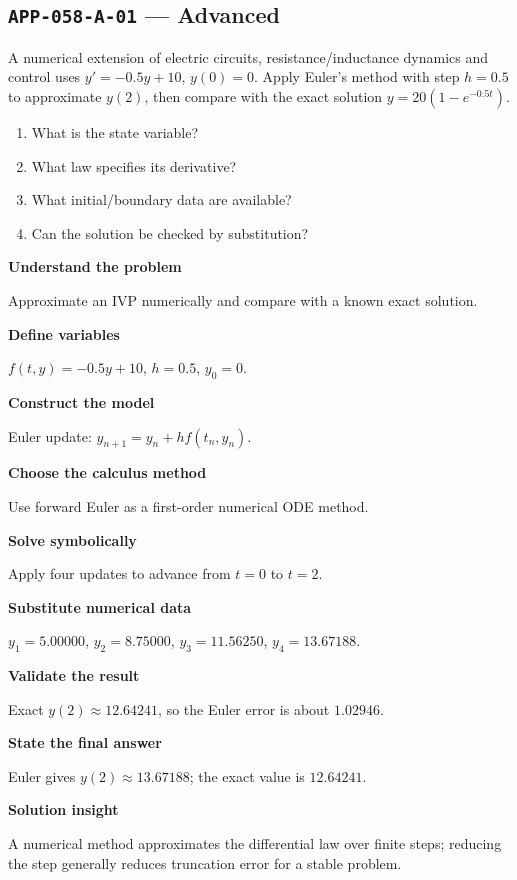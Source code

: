 \documentclass[11pt]{book}
\newcommand{\pid}[1]{\texttt{#1}}
\begin{document}
\subsection*{\pid{APP-058-A-01} — Advanced}
\begin{problembox}
A numerical extension of electric circuits, resistance/inductance dynamics and control uses $y'=-0.5y+10$, $y(0)=0$. Apply Euler's method with step $h=0.5$ to approximate $y(2)$, then compare with the exact solution $y=20(1-e^{-0.5t})$.
\end{problembox}
\begin{promptbox}\begin{enumerate}
\item What is the state variable?
\item What law specifies its derivative?
\item What initial/boundary data are available?
\item Can the solution be checked by substitution?
\end{enumerate}\end{promptbox}
\begin{solutionbox}
\textbf{Understand the problem}\par Approximate an IVP numerically and compare with a known exact solution.\par\medskip
\textbf{Define variables}\par $f(t,y)=-0.5y+10$, $h=0.5$, $y_0=0$.\par\medskip
\textbf{Construct the model}\par Euler update: $y_{n+1}=y_n+h f(t_n,y_n)$.\par\medskip
\textbf{Choose the calculus method}\par Use forward Euler as a first-order numerical ODE method.\par\medskip
\textbf{Solve symbolically}\par Apply four updates to advance from $t=0$ to $t=2$.\par\medskip
\textbf{Substitute numerical data}\par $y_1=5.00000$, $y_2=8.75000$, $y_3=11.56250$, $y_4=13.67188$.\par\medskip
\textbf{Validate the result}\par Exact $y(2)\approx 12.64241$, so the Euler error is about $1.02946$.\par\medskip
\textbf{State the final answer}\par Euler gives $y(2)\approx 13.67188$; the exact value is $12.64241$.\par\medskip
\textbf{Solution insight}\par A numerical method approximates the differential law over finite steps; reducing the step generally reduces truncation error for a stable problem.\par\medskip
\end{solutionbox}
\end{document}
